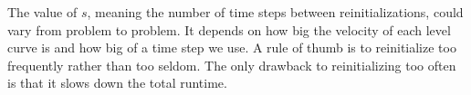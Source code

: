 The value of $s$, meaning the number of time steps between reinitializations, could vary from problem to problem. It depends on how big the velocity of each level curve is and how big of a time step we use. A rule of thumb is to reinitialize too frequently rather than too seldom. The only drawback to reinitializing too often is that it slows down the total runtime.
